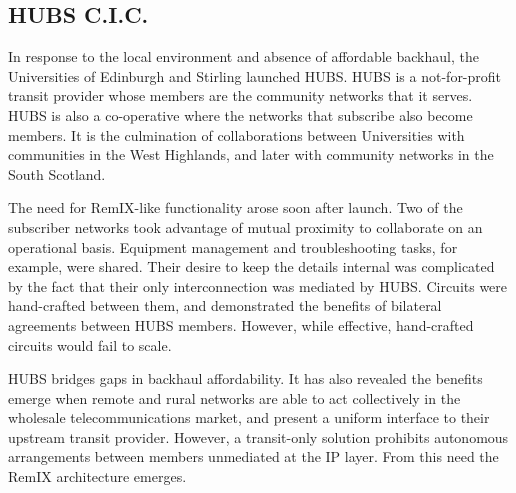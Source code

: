 \subsection{HUBS C.I.C.}\label{subsec:hubs}

In response to the local environment and absence of affordable
backhaul, the Universities of Edinburgh and Stirling launched
HUBS. HUBS is a not-for-profit transit provider whose members are the
community networks that it serves.  HUBS is also a co-operative where
the networks that subscribe also become members. It is the culmination
of collaborations between Universities with communities in the West
Highlands, and later with community networks in the South Scotland.

The need for RemIX-like functionality arose soon after launch. Two of
the subscriber networks took advantage of mutual proximity to
collaborate on an operational basis. Equipment management and
troubleshooting tasks, for example, were shared. Their desire to keep
the details internal was complicated by the fact that their only
interconnection was mediated by HUBS. Circuits were hand-crafted
between them, and demonstrated the benefits of bilateral agreements
between HUBS members. However, while effective, hand-crafted circuits
would fail to scale.

HUBS bridges gaps in backhaul affordability. It has also revealed the
benefits emerge when remote and rural networks are able to act
collectively in the wholesale telecommunications market, and present a
uniform interface to their upstream transit provider. However, a
transit-only solution prohibits autonomous arrangements between
members unmediated at the IP layer. From this need the RemIX
architecture emerges.


